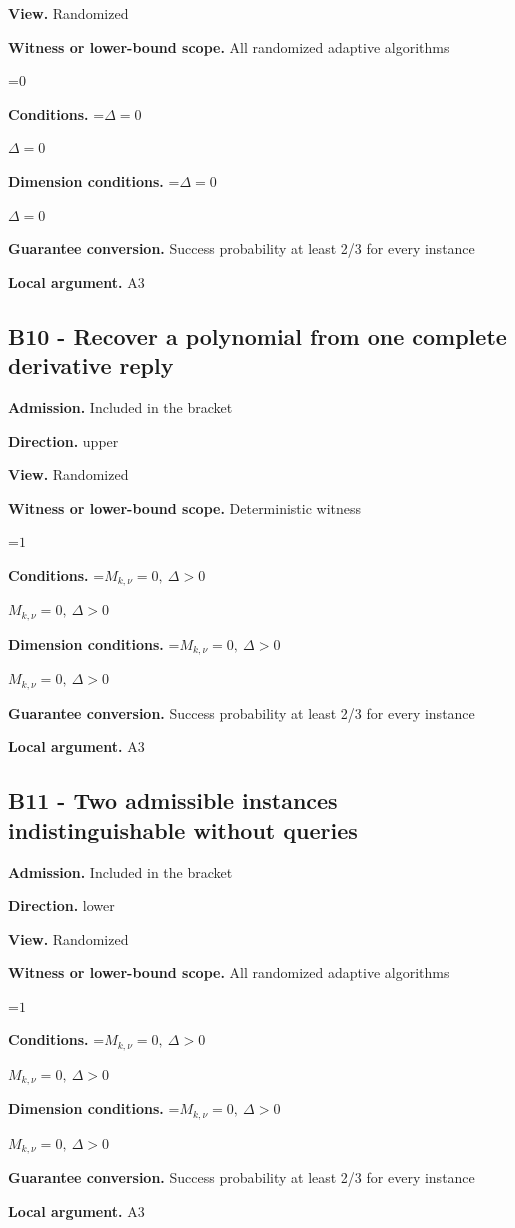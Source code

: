 \documentclass[10pt,a4paper]{article}
\newcommand{\AtlasMath}[1]{\par\begingroup\centering\setbox0=\hbox{$\displaystyle #1$}\ifdim\wd0>1.4\linewidth\typeout{ATLAS WIDE FORMULA: \the\wd0}\fi\ifdim\wd0>\linewidth\resizebox{\linewidth}{!}{\box0}\else\box0\fi\par\endgroup}
\newcommand{\AtlasInlineMath}[1]{\begingroup\setbox0=\hbox{$#1$}\ifdim\wd0>.4\linewidth\endgroup\AtlasMath{#1}\else\endgroup$#1$\fi}
\begin{document}
\textbf{View.} Randomized

\textbf{Witness or lower-bound scope.} All randomized adaptive algorithms

\AtlasMath{0}
\textbf{Conditions.} \AtlasInlineMath{\Delta=0}

\textbf{Dimension conditions.} \AtlasInlineMath{\Delta=0}

\textbf{Guarantee conversion.} Success probability at least 2/3 for every instance

\textbf{Local argument.} A3

\subsection{B10 - Recover a polynomial from one complete derivative reply}
\textbf{Admission.} Included in the bracket

\textbf{Direction.} upper

\textbf{View.} Randomized

\textbf{Witness or lower-bound scope.} Deterministic witness

\AtlasMath{1}
\textbf{Conditions.} \AtlasInlineMath{M_{k,\nu}=0,\ \Delta>0}

\textbf{Dimension conditions.} \AtlasInlineMath{M_{k,\nu}=0,\ \Delta>0}

\textbf{Guarantee conversion.} Success probability at least 2/3 for every instance

\textbf{Local argument.} A3

\subsection{B11 - Two admissible instances indistinguishable without queries}
\textbf{Admission.} Included in the bracket

\textbf{Direction.} lower

\textbf{View.} Randomized

\textbf{Witness or lower-bound scope.} All randomized adaptive algorithms

\AtlasMath{1}
\textbf{Conditions.} \AtlasInlineMath{M_{k,\nu}=0,\ \Delta>0}

\textbf{Dimension conditions.} \AtlasInlineMath{M_{k,\nu}=0,\ \Delta>0}

\textbf{Guarantee conversion.} Success probability at least 2/3 for every instance

\textbf{Local argument.} A3
\end{document}
